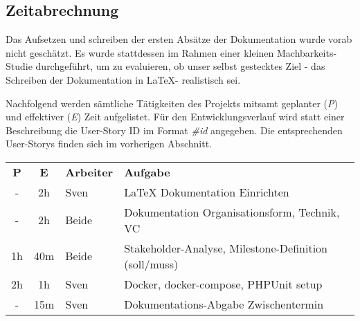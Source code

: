 \subsection{Zeitabrechnung}
Das Aufsetzen und schreiben der ersten Absätze der Dokumentation wurde vorab nicht geschätzt. Es wurde stattdessen im Rahmen einer kleinen Machbarkeits-Studie durchgeführt, um zu evaluieren, ob unser selbst gestecktes Ziel - das Schreiben der Dokumentation in \LaTeX - realistisch sei.

Nachfolgend werden sämtliche Tätigkeiten des Projekts mitsamt geplanter (\emph{P}) und effektiver (\emph{E}) Zeit aufgelistet. Für den Entwicklungsverlauf wird statt einer Beschreibung die User-Story ID im Format \emph{\#id} angegeben. Die entsprechenden User-Storys finden sich im vorherigen Abschnitt.

\vspace{5mm}

\begin{tabular}{ c c l l }
  \textbf{P} & \textbf{E} & \textbf{Arbeiter} & \textbf{Aufgabe} \\
  - & 2h & Sven & LaTeX Dokumentation Einrichten \\
  - & 2h & Beide & Dokumentation Organisationsform, Technik, VC\\
  1h & 40m & Beide & Stakeholder-Analyse, Milestone-Definition (soll/muss) \\
  2h & 1h & Sven & Docker, docker-compose, PHPUnit setup \\
  - & 15m & Sven & Dokumentations-Abgabe Zwischentermin
\end{tabular}

